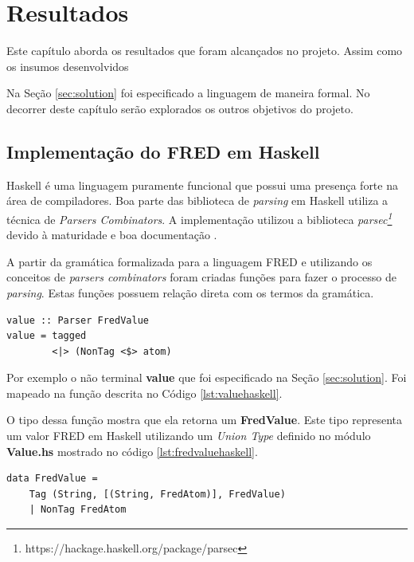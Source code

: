 \chapter[Resultados]{Resultados}

Este capítulo aborda os resultados que foram alcançados no projeto.
Assim como os insumos desenvolvidos

Na Seção \ref{sec:solution} foi especificado a linguagem de maneira formal.
No decorrer deste capítulo serão explorados os outros objetivos do projeto.

\section{Implementação do FRED em Haskell}

Haskell é uma linguagem puramente funcional que possui uma presença
forte na área de compiladores. Boa parte das biblioteca 
de \textit{parsing} em Haskell utiliza a técnica de \textit{Parsers Combinators}.
A implementação utilizou a biblioteca 
\textit{parsec\footnote{https://hackage.haskell.org/package/parsec}}
devido à maturidade e boa documentação \cite{leijen2001parsec}.

A partir da gramática formalizada para a linguagem FRED e utilizando os
conceitos de \textit{parsers combinators} foram criadas funções para
fazer o processo de \textit{parsing}. Estas funções possuem relação
direta com os termos da gramática.

\begin{lstlisting}[caption=Parser para o não terminal value,label={lst:valuehaskell}]
value :: Parser FredValue
value = tagged 
        <|> (NonTag <$> atom)
\end{lstlisting}

Por exemplo o não terminal \textbf{value} que foi especificado 
na Seção \ref{sec:solution}. Foi mapeado na função descrita no 
Código \ref{lst:valuehaskell}. 

O tipo dessa função mostra que ela retorna um \textbf{FredValue}. 
Este tipo representa um valor FRED em Haskell utilizando um 
\textit{Union Type} definido no módulo \textbf{Value.hs} 
mostrado no código \ref{lst:fredvaluehaskell}.

\begin{lstlisting}[caption=Definição do tipo FredValue,label={lst:fredvaluehaskell}]
data FredValue =
    Tag (String, [(String, FredAtom)], FredValue)
    | NonTag FredAtom
\end{lstlisting}


